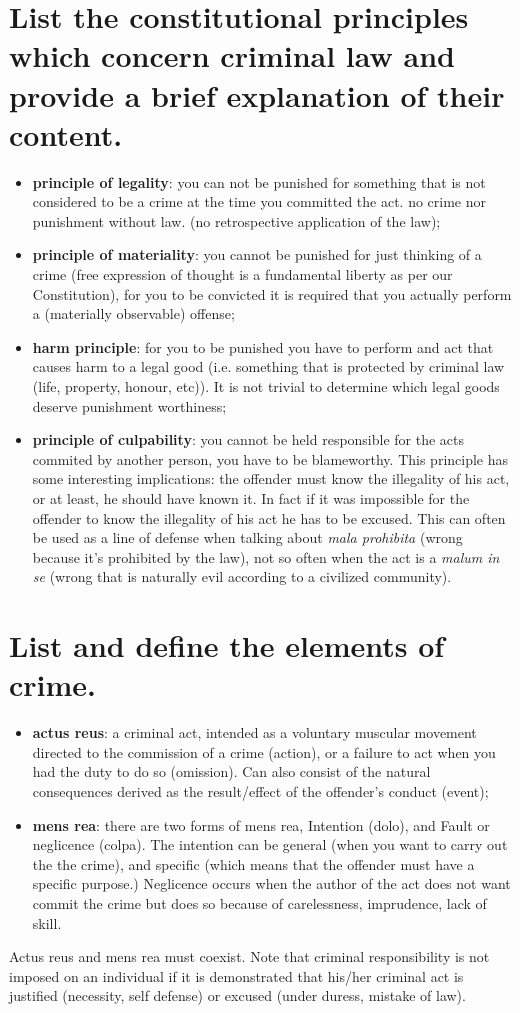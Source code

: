 \documentclass[a4paper, 11pt]{article}
\begin{document}
\section{List the constitutional principles which concern criminal law and provide a brief explanation of their content.}
\begin{itemize}
	\item \textbf{principle of legality}: you can not be punished for something that is not considered to be a crime at the time you committed the act. no crime nor punishment without law. (no retrospective application of the law);
	\item \textbf{principle of materiality}: you cannot be punished for just thinking of a crime (free expression of thought is a fundamental liberty as per our Constitution), for you to be convicted it is required that you actually perform a (materially observable) offense;
	\item \textbf{harm principle}: for you to be punished you have to perform and act that causes harm to a legal good (i.e. something that is protected by criminal law (life, property, honour, etc)). It is not trivial to determine which legal goods deserve punishment worthiness;
	\item \textbf{principle of culpability}: you cannot be held responsible for the acts commited by another person, you have to be blameworthy. This principle has some interesting implications: the offender must know the illegality of his act, or at least, he should have known it. In fact if it was impossible for the offender to
	know the illegality of his act he has to be excused. This can often be used as a line of defense when talking about \textit{mala prohibita} (wrong because it's prohibited by the law), not so often when the act is a \textit{malum in se} (wrong that is naturally evil according to a civilized community).
\end{itemize}

\section{List and define the elements of crime.}
\begin{itemize}
	\item \textbf{actus reus}: a criminal act, intended as a voluntary muscular movement directed to the commission of a crime (action), or a failure to act when you had the duty to do so (omission). Can also consist of the natural consequences derived as the result/effect of the offender's conduct (event);
	\item \textbf{mens rea}: there are two forms of mens rea, Intention (dolo), and Fault or neglicence (colpa). The intention can be general (when you want to carry out the the crime), and specific (which means that the offender must have a specific purpose.) Neglicence occurs when the author of the act does not want commit the crime but does so because of carelessness, imprudence, lack of skill.
\end{itemize}
Actus reus and mens rea must coexist. Note that criminal responsibility is not imposed on an individual if it is demonstrated that his/her criminal act is justified (necessity, self defense) or excused (under duress, mistake of law).
\end{document}
